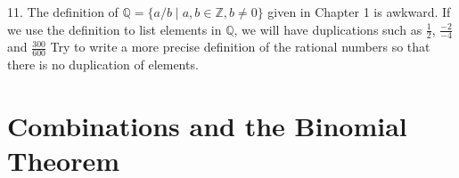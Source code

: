\documentclass[10pt,]{book}
\theoremstyle{plain}
\theoremstyle{definition}
\begin{document}
\par\smallskip\noindent
\hypertarget{exercisegroup-16}{}\begin{exercisegroup}
\item[11.]\hypertarget{exercise-83}{}The definition of \(\mathbb{Q}  = \{a/b \mid a, b \in \mathbb{Z}, b \neq 0\}\) given in Chapter 1 is  awkward. If we use the definition to list elements in \(\mathbb{Q}\), we will have duplications such as \(\frac{1}{2}\), \(\frac{-2}{-4}\) and \(\frac{300}{600}\)   Try to write a more precise definition of the rational numbers so that there is no duplication of elements.
\par\smallskip
\end{exercisegroup}
\par\smallskip\noindent
\typeout{************************************************}
\typeout{************************************************}
\section[Combinations and the Binomial Theorem]{Combinations and the Binomial Theorem}\label{combinations-and-the-binomial-theorem}
\typeout{************************************************}
\typeout{************************************************}
\end{document}
